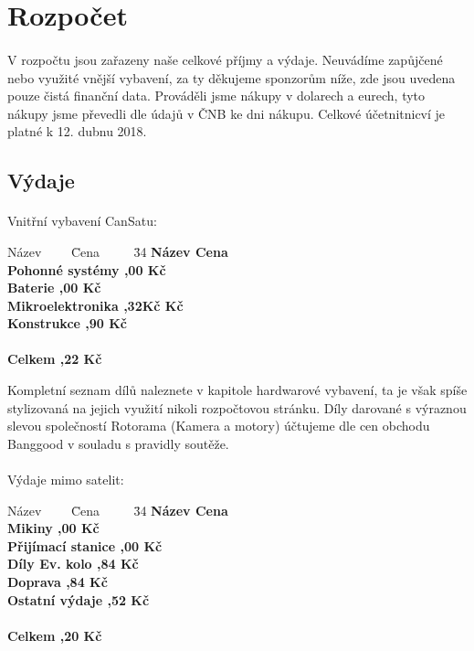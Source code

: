 \documentclass[a4paper]{report}
\begin{document}
\section{Rozpočet}
\paragraph{} V rozpočtu jsou zařazeny naše celkové příjmy a výdaje. Neuvádíme zapůjčené nebo využité vnější vybavení, za ty děkujeme sponzorům níže, zde jsou uvedena pouze čistá finanční data. Prováděli jsme nákupy v dolarech a eurech, tyto nákupy jsme převedli dle údajů v ČNB ke dni nákupu. Celkové účetnitnicví je platné k 12. dubnu 2018.
\subsection {Výdaje}
\paragraph{} Vnitřní vybavení CanSatu:
 \begin{tabbing}
    Název ~~~~\= Cena ~~~~
    \= 34 \kill
    \bfseries  Název\>\>
    \bfseries Cena\>\\
    Pohonné systémy \>,00 Kč\\
    Baterie \>,00 Kč\\
    Mikroelektronika \>,32Kč Kč\\
    Konstrukce \>,90 Kč\\\\
    Celkem \>,22 Kč\\
    \end{tabbing}
Kompletní seznam dílů naleznete v kapitole hardwarové vybavení, ta je však spíše stylizovaná na jejich využití nikoli rozpočtovou stránku. Díly darované s výraznou slevou společností Rotorama (Kamera a motory) účtujeme dle cen obchodu Banggood v souladu s pravidly soutěže.
\paragraph{} Výdaje mimo satelit:
 \begin{tabbing}
    Název ~~~~\= Cena ~~~~
    \= 34 \kill
    \bfseries  Název\>\>
    \bfseries Cena\>\\
    Mikiny \>,00 Kč\\
    Přijímací stanice \>,00 Kč\\
    Díly Ev. kolo \>,84 Kč\\
    Doprava \>,84 Kč\\
    Ostatní výdaje \>,52 Kč\\\\
    Celkem \>,20 Kč\\
    \end{tabbing}
\end{document}
